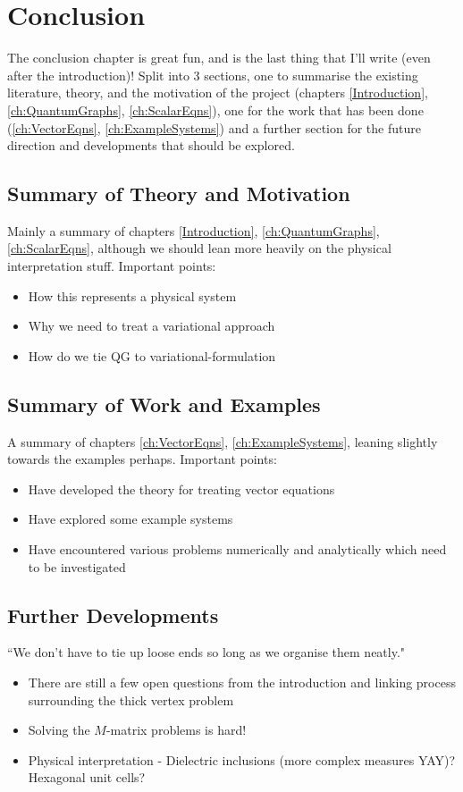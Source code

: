 \chapter{Conclusion} \label{ch:Conclusion}
The conclusion chapter is great fun, and is the last thing that I'll write (even after the introduction)!
Split into 3 sections, one to summarise the existing literature, theory, and the motivation of the project (chapters \ref{Introduction}, \ref{ch:QuantumGraphs}, \ref{ch:ScalarEqns}), one for the work that has been done (\ref{ch:VectorEqns}, \ref{ch:ExampleSystems}) and a further section for the future direction and developments that should be explored.

\section{Summary of Theory and Motivation}
Mainly a summary of chapters \ref{Introduction}, \ref{ch:QuantumGraphs}, \ref{ch:ScalarEqns}, although we should lean more heavily on the physical interpretation stuff.
Important points:
\begin{itemize}
	\item How this represents a physical system
	\item Why we need to treat a variational approach
	\item How do we tie QG to variational-formulation
\end{itemize}

\section{Summary of Work and Examples}
A summary of chapters \ref{ch:VectorEqns}, \ref{ch:ExampleSystems}, leaning slightly towards the examples perhaps.
Important points:
\begin{itemize}
	\item Have developed the theory for treating vector equations
	\item Have explored some example systems
	\item Have encountered various problems numerically and analytically which need to be investigated
\end{itemize}

\section{Further Developments}
``We don't have to tie up loose ends so long as we organise them neatly."
\begin{itemize}
	\item There are still a few open questions from the introduction and linking process surrounding the thick vertex problem
	\item Solving the $M$-matrix problems is hard!
	\item Physical interpretation - Dielectric inclusions (more complex measures YAY)? Hexagonal unit cells?
\end{itemize}
